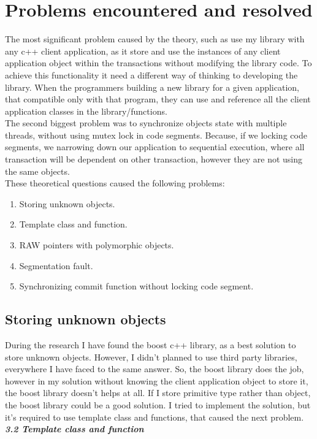 \documentclass[12pt]{article}
\begin{document}
\section{Problems encountered and resolved}
The most significant problem caused by the theory, such as use my library with any c++ client application, as it store and use the instances of any client application object within the transactions without modifying the library code. To achieve this functionality it need a different way of thinking to developing the library. When the programmers building a new library for a given application, that compatible only with that program, they can use and reference all the client application classes in the library/functions.\\

The second biggest problem was to synchronize objects state with multiple threads, without using mutex lock in code segments. Because, if we locking code segments, we narrowing down our application to sequential execution, where all transaction will be dependent on other transaction, however they are not using the same objects.\\
These theoretical questions caused the following problems:
\begin{enumerate}
\item Storing unknown objects. 
\item Template class and function.
\item RAW pointers with polymorphic objects.
\item Segmentation fault.
\item Synchronizing commit function without locking code segment.
\end{enumerate}
 
\subsection{Storing unknown objects}
During the research I have found the boost c++ library, as a best solution to store unknown objects. However, I didn't planned to use third party libraries, everywhere I have faced to the same answer. So, the boost library does the job, however in my solution without knowing the client application object to store it, the boost library doesn't helps at all. If I store primitive type rather than object, the boost library could be a good solution. I tried to implement the solution, but it's required to use template class and functions, that caused the next problem. \textbf{\textit{3.2 Template class and function}}
\end{document}
